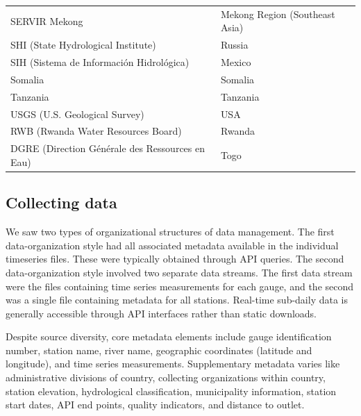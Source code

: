 \begin{table}[!htbp]
\begin{tabular}{@{}L{0.64\textwidth}L{0.30\textwidth}@{}}
SERVIR Mekong & Mekong Region (Southeast Asia) \\
SHI (State Hydrological Institute) & Russia \\
SIH (Sistema de Información Hidrológica) & Mexico \\
Somalia & Somalia \\
Tanzania & Tanzania \\
USGS (U.S. Geological Survey) & USA \\
RWB (Rwanda Water Resources Board) & Rwanda \\
DGRE (Direction Générale des Ressources en Eau) & Togo \\
\bottomrule
\end{tabular}
\end{table}

\subsection{Collecting data}


We saw two types of organizational structures of data management. The first data-organization style had all associated metadata available in the individual timeseries files. These were typically obtained through API queries. The second data-organization style involved two separate data streams. The first data stream were the files containing time series measurements for each gauge, and the second was a single file containing metadata for all stations. Real-time sub-daily data is generally accessible through API interfaces rather than static downloads.

Despite source diversity, core metadata elements include gauge identification number, station name, river name, geographic coordinates (latitude and longitude), and time series measurements. Supplementary metadata varies like administrative divisions of country, collecting organizations within country, station elevation, hydrological classification, municipality information, station start dates, API end points, quality indicators, and distance to outlet.

